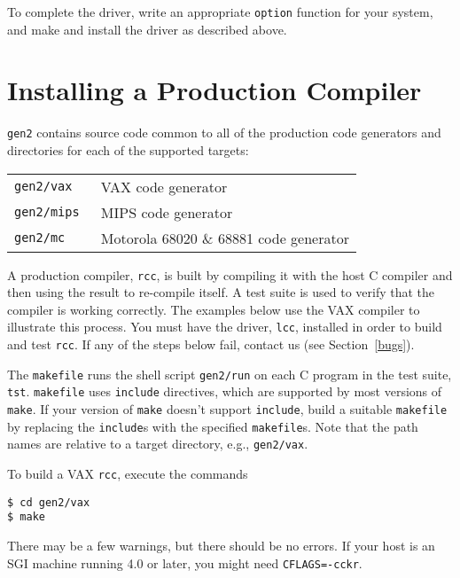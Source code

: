 To complete the driver,
write an appropriate \verb|option| function for your system,
and make and install the driver as described above.

\section{Installing a Production Compiler}\label{gen2}

\verb|gen2| contains source code common to all of the production
code generators and directories for each of the supported targets:

\begin{center}
\begin{tabular}{ll}
\tt gen2/vax	& VAX code generator \\
\tt gen2/mips	& MIPS code generator \\
\tt gen2/mc	& Motorola 68020 \& 68881 code generator \\
\end{tabular}
\end{center}

A production compiler, \verb|rcc|, is built by compiling it
with the host C compiler and then using the result to re-compile itself.
A test suite is used to
verify that the compiler is working correctly.
The examples below use the VAX compiler to illustrate this process.
You must have the driver, \verb|lcc|, installed in order
to build and test \verb|rcc|.
If any of the steps below fail, contact us (see Section~\ref{bugs}).

The \verb|makefile| runs the shell script
\verb|gen2/run| on each C program in the test suite, \verb|tst|.
\verb|makefile| uses \verb|include| directives, which are supported by
most versions of \verb|make|. If your version of \verb|make|
doesn't support \verb|include|, build a suitable \verb|makefile|
by replacing the \verb|include|s with the specified \verb|makefile|s.
Note that the path names are relative to a target directory, e.g., \verb|gen2/vax|.

To build a VAX \verb|rcc|, execute the commands
\begin{verbatim}
$ cd gen2/vax
$ make
\end{verbatim}
There may be a few warnings, but there should be no errors.
If your host is an SGI machine running 4.0 or later,
you might need \verb|CFLAGS=-cckr|.

